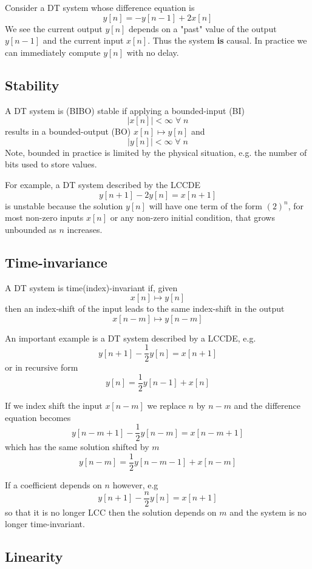 \begin{example}
Consider a DT system whose difference equation is
\[
y[n] = -y[n-1] + 2x[n]
\]
We see the current output $y[n]$ depends on a "past" value of the output $y[n-1]$ and the current input $x[n]$. Thus the system \textbf{is} causal. In practice we can immediately compute $y[n]$ with no delay. 
\end{example}

\subsection{Stability}

A DT system is (BIBO) stable if applying a bounded-input (BI)
\[
\left|x[n]\right| < \infty \; \forall \; n
\]
results in a bounded-output (BO) $x[n] \mapsto y[n]$ and 
\[
\left|y[n]\right| < \infty \; \forall \; n
\]
Note, bounded in practice is limited by the physical situation, e.g. the number of bits used to store values.

For example, a DT system described by the LCCDE
\[
y[n+1] - 2 y[n] = x[n+1]
\]
is unstable because the solution $y[n]$ will have one term of the form $\left( 2\right)^n$, for most non-zero inputs $x[n]$ or any non-zero initial condition, that grows unbounded as $n$ increases.

\subsection{Time-invariance}
A DT system is time(index)-invariant if, given
\[
x[n] \mapsto y[n]
\]
then an index-shift of the input leads to the same index-shift in the output
\[
x[n-m] \mapsto y[n-m]
\]

An important example is a DT system described by a LCCDE, e.g.
\[
y[n+1] - \frac{1}{2} y[n] = x[n+1]
\]
or in recursive form
\[
y[n] = \frac{1}{2} y[n-1] + x[n]
\]

If we index shift the input $x[n - m]$ we replace $n$ by $n-m$ and the difference equation becomes
\[
y[n-m+1] - \frac{1}{2} y[n-m] = x[n-m+1]
\]
which has the same solution shifted by $m$
\[
y[n-m] = \frac{1}{2} y[n-m -1] + x[n-m]
\]

If a coefficient depends on $n$ however, e.g
\[
y[n+1] - \frac{n}{2} y[n] = x[n+1]
\]
so that it is no longer LCC then the solution depends on $m$ and the system is no longer time-invariant.

\subsection{Linearity}

